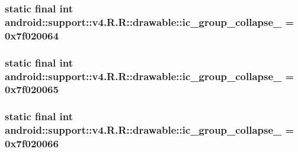 \hypertarget{classandroid_1_1support_1_1v4_1_1_r_1_1drawable_5c92a9056b2aa7d0bea6a6752e86882f}{
\subsubsection[{ic\_\-group\_\-collapse\_\-05}]{\setlength{\rightskip}{0pt plus 5cm}static final int android::support::v4.R.R::drawable::ic\_\-group\_\-collapse\_ = 0x7f020064}}
\label{classandroid_1_1support_1_1v4_1_1_r_1_1drawable_5c92a9056b2aa7d0bea6a6752e86882f}


\hypertarget{classandroid_1_1support_1_1v4_1_1_r_1_1drawable_28649a34223de17ef02e157883af15c0}{
\subsubsection[{ic\_\-group\_\-collapse\_\-06}]{\setlength{\rightskip}{0pt plus 5cm}static final int android::support::v4.R.R::drawable::ic\_\-group\_\-collapse\_ = 0x7f020065}}
\label{classandroid_1_1support_1_1v4_1_1_r_1_1drawable_28649a34223de17ef02e157883af15c0}


\hypertarget{classandroid_1_1support_1_1v4_1_1_r_1_1drawable_591580d546dc50dc6c0d0425bc59171d}{
\subsubsection[{ic\_\-group\_\-collapse\_\-07}]{\setlength{\rightskip}{0pt plus 5cm}static final int android::support::v4.R.R::drawable::ic\_\-group\_\-collapse\_ = 0x7f020066}}
\label{classandroid_1_1support_1_1v4_1_1_r_1_1drawable_591580d546dc50dc6c0d0425bc59171d}


